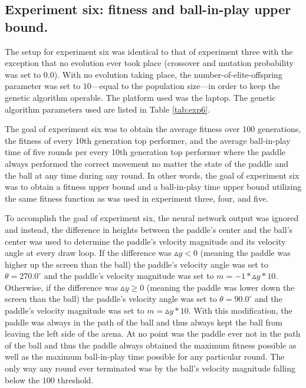 \documentclass[a4paper,10pt]{article}
\begin{document}
\subsection{Experiment six: fitness and ball-in-play upper bound.}

The setup for experiment six was identical to that of experiment three with the exception that no evolution ever took place (crossover and mutation probability was set to $0.0$). With no evolution taking place, the number-of-elite-offspring parameter was set to $10$---equal to the population size---in order to keep the genetic algorithm operable. The platform used was the laptop. The genetic algorithm parameters used are listed in Table \ref{tab:exp6}. 

The goal of experiment six was to obtain the average fitness over 100 generations, the fitness of every 10th generation top performer, and the average ball-in-play time of five rounds per every 10th generation top performer where the paddle always performed the correct movement no matter the state of the paddle and the ball at any time during any round. In other words, the goal of experiment six was to obtain a fitness upper bound and a ball-in-play time upper bound utilizing the same fitness function as was used in experiment three, four, and five. 

To accomplish the goal of experiment six, the neural network output was ignored and instead, the difference in heights between the paddle's center and the ball's center was used to determine the paddle's velocity magnitude and its velocity angle at every draw loop. If the difference was $\vartriangle\!y<0$ (meaning the paddle was higher up the screen than the ball) the paddle's velocity angle was set to $\theta=270.0^\circ$ and the paddle's velocity magnitude was set to $m = -1 * \vartriangle\!y * 10$. Otherwise, if the difference was $\vartriangle\!y\geq 0$ (meaning the paddle was lower down the screen than the ball) the paddle's velocity angle was set to $\theta=90.0^\circ$ and the paddle's velocity magnitude was set to $m = \vartriangle\!y * 10$. With this modification, the paddle was always in the path of the ball and thus always kept the ball from leaving the left side of the arena. At no point was the paddle ever not in the path of the ball and thus the paddle always obtained the maximum fitness possible as well as the maximum ball-in-play time possible for any particular round. The only way any round ever terminated was by the ball's velocity magnitude falling below the $100$ threshold. 
\end{document}
